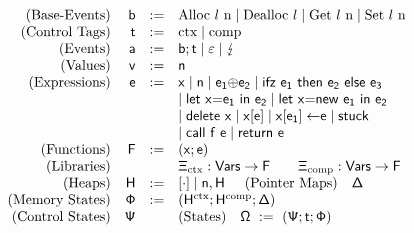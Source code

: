 \documentclass[dvipsnames,conference]{IEEEtran}
\theoremstyle{definition}
\begin{document}
\vspace{-.5em}
{
  \renewcommand{\src}[1]{\mathsf{#1}}
\[
  \begin{array}{rrcl}
    \text{(Base-Events)} & \src{\preevent} &:=& \src{\ev{Alloc \loc\ n}} \mid \src{\ev{Dealloc \loc}} \mid \src{\ev{Get \loc\ n}} \mid \src{\ev{Set \loc\ n}} \\
    \text{(Control Tags)} & \src{\sandboxtag} &:=& \src{\ctx} \mid \src{\comp} \\
    \text{(Events)} & \src{\event} &:=& \src{\preevent;\sandboxtag} \mid \src{\emptyevent} \mid \src{\lightning} \\ 
    \text{(Values)} & \src{v} &:=& \src{n} \\
    \text{(Expressions)} & \src{\expr} &:=& \src{x} \mid \src{n} \mid \src{\lbinop{\expr[_1]}{\expr[_2]}} \mid \src{\lifz{\expr[_1]}{\expr[_2]}{\expr[_3]}} \\ 
                         &&&\mid \src{\llet{x}{\expr[_1]}{\expr[_2]}} \mid \src{\llet{x}{new\ \expr[_1]}{\expr[_2]}} \\
                         &&&\mid \src{\ldelete{x}} \mid \src{\lget{x}{\expr}} \mid \src{\lset{x}{\expr[_1]}{\expr[]}} \mid \src{stuck}\\
                         &&&\mid \src{\lcall{f}{\expr}} \mid \src{\lreturn{\expr}} \\
    \text{(Functions)} & \src{F} &:=& (\src{x};\src{\expr}) \\
    \text{(Libraries)} &&& \src{\library_{\ctx}} : \src{Vars} \to \src{F} \hspace{2em}
    \src{\library_{\comp}} : \src{Vars} \to \src{F} \\
    \text{(Heaps)} & \src{H} &:=& \src{\hole{\cdot}} \mid \src{n},\src{H}\hspace{0.5cm}    \text{(Pointer Maps)}\ \ \ \src{\Delta} \\
    \text{(Memory States)} & \src{\memstate} &:=& \left(\src{H^{\ctx}};\src{H^{\comp}};\src{\Delta}\right)\\
  \text{(Control States)} & \src{\cfstate} & & \text{(States)}\ \ \ \src{\Omega}\ :=\ \left(\src{\cfstate};\src{\sandboxtag};\src{\memstate}\right)\\
  \end{array}
\]
}
\end{document}
